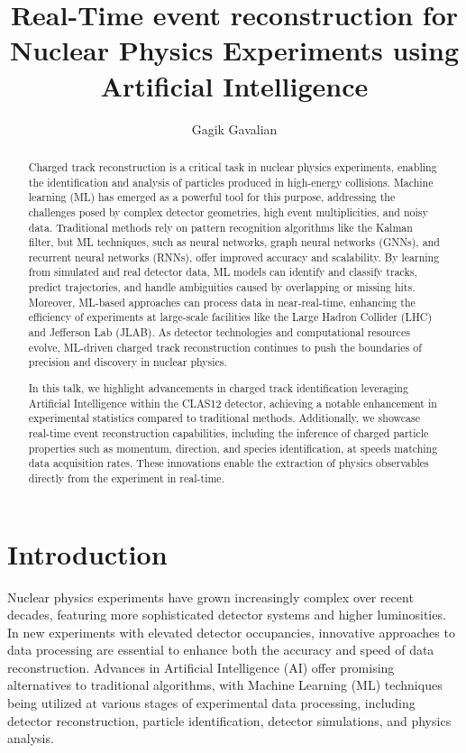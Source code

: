 \documentclass[preprint,12pt]{elsarticle}
\title{Real-Time event reconstruction for Nuclear Physics Experiments using Artificial Intelligence}
\author[1]{Gagik Gavalian}
\begin{document}

\begin{abstract}
\indent
Charged track reconstruction is a critical task in nuclear physics experiments, enabling the identification and analysis of particles produced in high-energy collisions. Machine learning (ML) has emerged as a powerful tool for this purpose, addressing the challenges posed by complex detector geometries, high event multiplicities, and noisy data. Traditional methods rely on pattern recognition algorithms like the Kalman filter, but ML techniques, such as neural networks, graph neural networks (GNNs), and recurrent neural networks (RNNs), offer improved accuracy and scalability. By learning from simulated and real detector data, ML models can identify and classify tracks, predict trajectories, and handle ambiguities caused by overlapping or missing hits. Moreover, ML-based approaches can process data in near-real-time, enhancing the efficiency of experiments at large-scale facilities like the Large Hadron Collider (LHC) and Jefferson Lab (JLAB). As detector technologies and computational resources evolve, ML-driven charged track reconstruction continues to push the boundaries of precision and discovery in nuclear physics. 

In this talk, we highlight advancements in charged track identification leveraging Artificial Intelligence within the CLAS12 detector, achieving a notable enhancement in experimental statistics compared to traditional methods. Additionally, we showcase real-time event reconstruction capabilities, including the inference of charged particle properties such as momentum, direction, and species identification, at speeds matching data acquisition rates. These innovations enable the extraction of physics observables directly from the experiment in real-time.
\end{abstract}
\maketitle

\section{Introduction}
\indent
Nuclear physics experiments have grown increasingly complex over recent decades, featuring more sophisticated detector systems and higher luminosities. In new experiments with elevated detector occupancies, innovative approaches to data processing are essential to enhance both the accuracy and speed of data reconstruction. Advances in Artificial Intelligence (AI) offer promising alternatives to traditional algorithms, with Machine Learning (ML) techniques being utilized at various stages of experimental data processing, including detector reconstruction, particle identification, detector simulations, and physics analysis.
\end{document}
